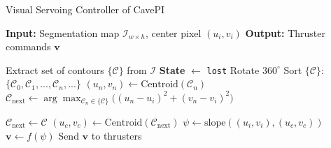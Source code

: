\begin{algorithm}[h]
\caption{Visual Servoing Controller of CavePI}
\label{alg:line_follower}
\begin{algorithmic}[1]
\STATE \textbf{Input:} Segmentation map $\mathcal{I}_{w\times h}$, center pixel $(u_i, v_i)$
\STATE \textbf{Output:} Thruster commands $\mathbf{v}$

    \STATE Extract set of contours $\{\mathcal{C}\}$ from $\mathcal{I}$
        \STATE \textbf{State} $\gets$ \texttt{lost} 
        \STATE Rotate $360^\circ$  
    \ELSE
            \STATE Sort $\{\mathcal{C}\}$:~$\{\mathcal{C}_0, \mathcal{C}_1, ..., \mathcal{C}_n, ...\}$ 
            \STATE $(u_n, v_n) \gets \text{Centroid} (\mathcal{C}_n)$
            \STATE $\mathcal{C}_\text{next} \gets \arg\max_{\mathcal{C}_n \in \{\mathcal{C}\}} \bigl((u_n - u_i)^2 + (v_n - v_i)^2\bigr)$ 

        \ELSE
            \STATE $\mathcal{C}_\text{next} \gets \mathcal{C}$
        \ENDIF
        \STATE $(u_c, v_c) \gets \text{Centroid}(\mathcal{C}_\text{next})$ 
        \STATE $\psi \gets \text{slope}((u_i, v_i), (u_c, v_c))$ 
        \STATE $\mathbf{v} \gets f(\psi)$ 
    \ENDIF
    \STATE Send $\mathbf{v}$ to thrusters
\ENDWHILE
\end{algorithmic}
\end{algorithm}






 


